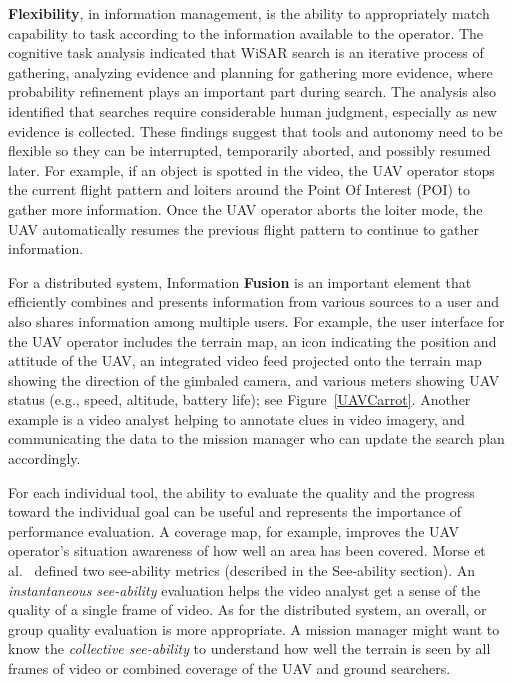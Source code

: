 \documentclass[letterpaper]{article}
\begin{document}
\textbf{Flexibility}, in information management, is the ability to appropriately match capability to task according to the information available to the operator.
The cognitive task analysis indicated that WiSAR search is an iterative process of gathering, analyzing evidence and planning for gathering more evidence, where probability refinement plays an important part during search. The analysis also identified that searches require considerable human judgment, especially as new evidence is collected. These findings suggest that tools and autonomy need to be flexible so they can be interrupted, temporarily aborted, and possibly resumed later. For example, if an object is spotted in the video, the UAV operator stops the current flight pattern and loiters around the Point Of Interest (POI) to gather more information. Once the UAV operator aborts the loiter mode, the UAV automatically resumes the previous flight pattern to continue to gather information.

For a distributed system, Information \textbf{Fusion} is an important element that efficiently combines and presents information from various sources to a user and also shares information among multiple users. For example, the user interface for the UAV operator includes the terrain map, an icon indicating the position and attitude of the UAV, an integrated video feed projected onto the terrain map showing the direction of the gimbaled camera, and various meters showing UAV status (e.g., speed, altitude, battery life); see Figure~\ref{UAVCarrot}. Another example is a video analyst helping to annotate clues in video imagery, and communicating the data to the mission manager who can update the search plan accordingly.

For each individual tool, the ability to evaluate the quality and the progress toward the individual goal can be useful and represents the importance of performance evaluation. A coverage map, for example, improves the UAV operator's situation awareness of how well an area has been covered. Morse et al.~\cite{morse2010coverage} defined two see-ability metrics (described in the See-ability section). An \textit{instantaneous see-ability} evaluation helps the video analyst get a sense of the quality of a single frame of video. As for the distributed system, an overall, or group quality evaluation is more appropriate. A mission manager might want to know the \textit{collective see-ability} to understand how well the terrain is seen by all frames of video or combined coverage of the UAV and ground searchers.
\end{document}
